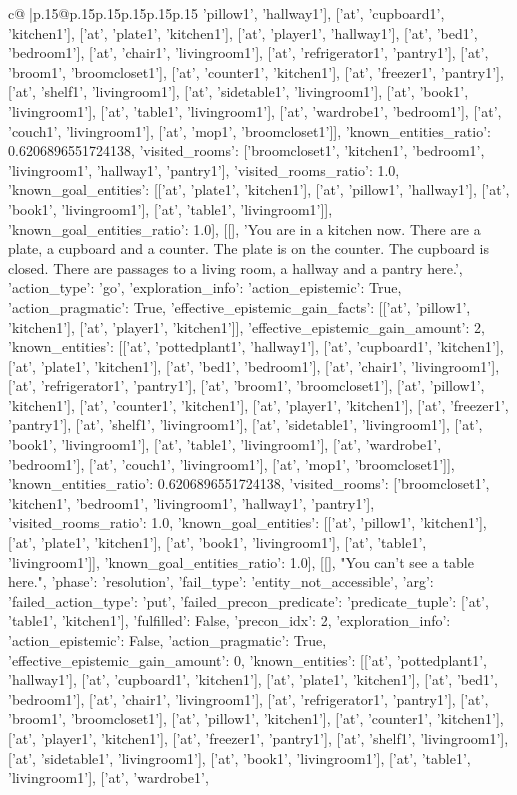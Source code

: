\documentclass{article}
\begin{document}
{\begin{supertabular}{c@{$\;$}|p{.15\linewidth}@{}p{.15\linewidth}p{.15\linewidth}p{.15\linewidth}p{.15\linewidth}p{.15\linewidth}}
{{{'pillow1', 'hallway1'], ['at', 'cupboard1', 'kitchen1'], ['at', 'plate1', 'kitchen1'], ['at', 'player1', 'hallway1'], ['at', 'bed1', 'bedroom1'], ['at', 'chair1', 'livingroom1'], ['at', 'refrigerator1', 'pantry1'], ['at', 'broom1', 'broomcloset1'], ['at', 'counter1', 'kitchen1'], ['at', 'freezer1', 'pantry1'], ['at', 'shelf1', 'livingroom1'], ['at', 'sidetable1', 'livingroom1'], ['at', 'book1', 'livingroom1'], ['at', 'table1', 'livingroom1'], ['at', 'wardrobe1', 'bedroom1'], ['at', 'couch1', 'livingroom1'], ['at', 'mop1', 'broomcloset1']], 'known_entities_ratio': 0.6206896551724138, 'visited_rooms': ['broomcloset1', 'kitchen1', 'bedroom1', 'livingroom1', 'hallway1', 'pantry1'], 'visited_rooms_ratio': 1.0, 'known_goal_entities': [['at', 'plate1', 'kitchen1'], ['at', 'pillow1', 'hallway1'], ['at', 'book1', 'livingroom1'], ['at', 'table1', 'livingroom1']], 'known_goal_entities_ratio': 1.0}}], [[], 'You are in a kitchen now. There are a plate, a cupboard and a counter. The plate is on the counter. The cupboard is closed. There are passages to a living room, a hallway and a pantry here.', {'action_type': 'go', 'exploration_info': {'action_epistemic': True, 'action_pragmatic': True, 'effective_epistemic_gain_facts': [['at', 'pillow1', 'kitchen1'], ['at', 'player1', 'kitchen1']], 'effective_epistemic_gain_amount': 2, 'known_entities': [['at', 'pottedplant1', 'hallway1'], ['at', 'cupboard1', 'kitchen1'], ['at', 'plate1', 'kitchen1'], ['at', 'bed1', 'bedroom1'], ['at', 'chair1', 'livingroom1'], ['at', 'refrigerator1', 'pantry1'], ['at', 'broom1', 'broomcloset1'], ['at', 'pillow1', 'kitchen1'], ['at', 'counter1', 'kitchen1'], ['at', 'player1', 'kitchen1'], ['at', 'freezer1', 'pantry1'], ['at', 'shelf1', 'livingroom1'], ['at', 'sidetable1', 'livingroom1'], ['at', 'book1', 'livingroom1'], ['at', 'table1', 'livingroom1'], ['at', 'wardrobe1', 'bedroom1'], ['at', 'couch1', 'livingroom1'], ['at', 'mop1', 'broomcloset1']], 'known_entities_ratio': 0.6206896551724138, 'visited_rooms': ['broomcloset1', 'kitchen1', 'bedroom1', 'livingroom1', 'hallway1', 'pantry1'], 'visited_rooms_ratio': 1.0, 'known_goal_entities': [['at', 'pillow1', 'kitchen1'], ['at', 'plate1', 'kitchen1'], ['at', 'book1', 'livingroom1'], ['at', 'table1', 'livingroom1']], 'known_goal_entities_ratio': 1.0}}], [[], "You can't see a table here.", {'phase': 'resolution', 'fail_type': 'entity_not_accessible', 'arg': {'failed_action_type': 'put', 'failed_precon_predicate': {'predicate_tuple': ['at', 'table1', 'kitchen1'], 'fulfilled': False, 'precon_idx': 2}}, 'exploration_info': {'action_epistemic': False, 'action_pragmatic': True, 'effective_epistemic_gain_amount': 0, 'known_entities': [['at', 'pottedplant1', 'hallway1'], ['at', 'cupboard1', 'kitchen1'], ['at', 'plate1', 'kitchen1'], ['at', 'bed1', 'bedroom1'], ['at', 'chair1', 'livingroom1'], ['at', 'refrigerator1', 'pantry1'], ['at', 'broom1', 'broomcloset1'], ['at', 'pillow1', 'kitchen1'], ['at', 'counter1', 'kitchen1'], ['at', 'player1', 'kitchen1'], ['at', 'freezer1', 'pantry1'], ['at', 'shelf1', 'livingroom1'], ['at', 'sidetable1', 'livingroom1'], ['at', 'book1', 'livingroom1'], ['at', 'table1', 'livingroom1'], ['at', 'wardrobe1', }}}
\end{supertabular}}
\end{document}
